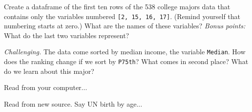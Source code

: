 \documentclass[11pt]{exam}
\begin{document}
\begin{questions}
\item Create a dataframe of the first ten rows of the 538 college majors data
that contains only the variables numbered \texttt{[2, 15, 16, 17]}.
(Remind yourself that numbering starts at zero.)
What are the names of these variables?
{\it Bonus points:\/} What do the last two variables represent?

\item {\it Challenging.\/}
The data come sorted by median income, the variable \texttt{Median}.
How does the ranking change if we sort by \texttt{P75th}?
What comes in second place?  What do we learn about this major?

\item Read from your computer...


\item Read from new source.  Say UN birth by age...


\end{questions}
\end{document}
